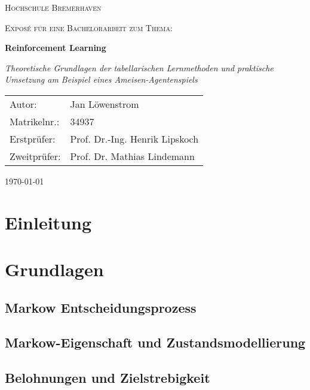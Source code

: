 \documentclass[12pt]{article}
\numberwithin{equation}{section}
\begin{document}
\begin{titlepage}
	\centering	
	{\scshape\LARGE Hochschule Bremerhaven \par}
	\vspace{1cm}
	{\scshape\Large Exposé für eine Bachelorarbeit zum Thema:\par}
	\vspace{1.5cm}
	{\huge\bfseries Reinforcement Learning\par}
	\vspace{2cm}
	{\Large\itshape Theoretische Grundlagen der tabellarischen Lernmethoden und praktische Umsetzung am Beispiel eines Ameisen-Agentenspiels
	\par}
	\vfill
	\begin{tabularx}{\textwidth}{lX}
		Autor: & Jan Löwenstrom \\
		Matrikelnr.: & 34937 \\
		Erstprüfer: & Prof. Dr.-Ing. Henrik Lipskoch \\
		Zweitprüfer: & Prof. Dr. Mathias Lindemann \\
	\end{tabularx}  
    \vfill

	{\large \today \par}       
\end{titlepage}

\tableofcontents
\pagebreak
\listoffigures
\newpage


\noindent
\section{Einleitung}


\pagebreak

\section{Grundlagen}
	
	\subsection{Markow Entscheidungsprozess}
	

	\subsection{Markow-Eigenschaft und Zustandsmodellierung}
	
	\pagebreak

	\subsection{Belohnungen und Zielstrebigkeit}
	
\end{document}
